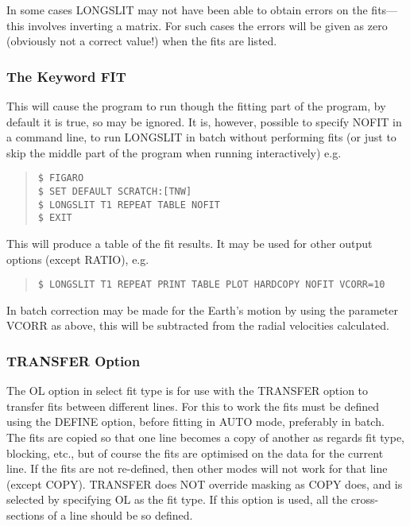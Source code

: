 In some cases LONGSLIT may not have been able to obtain errors on the
fits---this involves inverting a matrix.
For such cases the errors will be given as zero (obviously not a correct
value!) when the fits are listed.

\subsubsection{The Keyword FIT}
\label{long.fit}

This will cause the program to run though the fitting part of the
program, by default it is true, so may be ignored. It is, however,
possible to specify NOFIT in a command line, to run LONGSLIT in batch
without performing fits (or just to skip the middle part of the program
when running interactively) e.g.\ 
\begin{quote}\begin{verbatim}
$ FIGARO
$ SET DEFAULT SCRATCH:[TNW]
$ LONGSLIT T1 REPEAT TABLE NOFIT
$ EXIT
\end{verbatim}\end{quote}
This will produce a table of the fit results.
It may be used for other output options (except RATIO), e.g.\ 
\begin{quote}\begin{verbatim}
$ LONGSLIT T1 REPEAT PRINT TABLE PLOT HARDCOPY NOFIT VCORR=10
\end{verbatim}\end{quote}

  In batch correction may be made for the Earth's motion by using the
parameter VCORR as above, this will be subtracted from the radial
velocities calculated.

\subsubsection{TRANSFER Option}

The OL option in select fit type is for use with the TRANSFER option to
transfer fits between different lines. For this to work the fits must
be defined using the DEFINE option, before fitting in AUTO mode,
preferably in batch. The fits are copied so that one line becomes a
copy of another as regards fit type, blocking, etc., but of course the
fits are optimised on the data for the current line. If the fits are
not re-defined, then other modes will not work for that line (except
COPY). TRANSFER does NOT override masking as COPY does, and is selected
by specifying OL as the fit type.
If this option is used, all the cross-sections of a line should be so
defined.

